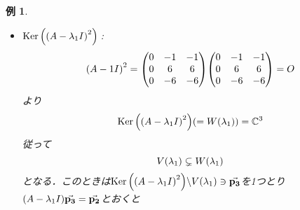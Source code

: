 \documentclass[autodetect-engine,dvipdfmx-if-dvi,ja=standard]{bxjsarticle}
\theoremstyle{mystyle1}
\theoremstyle{mystyle2}
\newtheorem{example}{例}
\newcommand{\bbC}{\ensuremath{\mathbb{C}}}
\newcommand{\Ker}{\ensuremath{\text{Ker\,}}}
\begin{document}
\begin{example}
\begin{itemize}
\begin{align*}
            y_3
            )=\va{0}                                           \\
              & \Leftrightarrow\begin{cases}
              y_2+y_3 & =0 \\
              0       & =0 \\
              0       & =0
            \end{cases}     \\
              & \Leftrightarrow\mqty(
            y_1                                                \\
            y_2                                                \\
            y_3
            )=\mqty(
            s                                                  \\
            -t                                                 \\
            t
            )=s\mqty(
            1                                                  \\
            0                                                  \\
            0                                                  \\
            )+t\mqty(
            0                                                  \\
            -1                                                 \\
            1
            )\quad\qty(s,t\text{は任意})
          \end{align*}
          従って
          \[\dim_\bbC V\qty(\lambda_1)=2<3=\qty(\lambda_1\text{の重複度})\]
          となって$A$は対角化可能でない．
    \item \underline{$\Ker\qty(\qty(A-\lambda_1I)^2)$}\,:
          \[
            \qty(A-1I)^2=\mqty(
            0&-1&-1\\
            0&6&6\\
            0&-6&-6
            )\mqty(
            0&-1&-1\\
            0&6&6\\
            0&-6&-6
            )=O
          \]
          より
          \[\Ker\qty(\qty(A-\lambda_1I)^2)\qty(=W\qty(\lambda_1))=\bbC^3\]
          従って
          \[V\qty(\lambda_1)\subsetneq W\qty(\lambda_1)\]
          となる．このときは$\Ker\qty(\qty(A-\lambda_1I)^2)\backslash V\qty(\lambda_1)\ni\va{p_3}$を1つとり$\qty(A-\lambda_1I)\va{p_3}=\va{p_2}$とおくと

\end{itemize}
\end{example}
\end{document}
